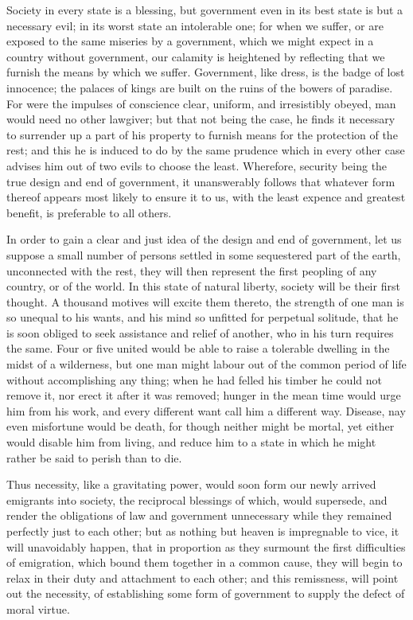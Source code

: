 \documentclass[12pt,oneside]{memoir}
\begin{document}
Society in every state is a blessing, but government even in its
best state is but a necessary evil; in its worst state an
intolerable one; for when we suffer, or are exposed to the same
miseries by a government, which we might expect in a country without
government, our calamity is heightened by reflecting that we furnish
the means by which we suffer. Government, like dress, is the badge
of lost innocence; the palaces of kings are built on the ruins of
the bowers of paradise. For were the impulses of conscience clear,
uniform, and irresistibly obeyed, man would need no other lawgiver;
but that not being the case, he finds it necessary to surrender up a
part of his property to furnish means for the protection of the rest;
and this he is induced to do by the same prudence which in every
other case advises him out of two evils to choose the least.
Wherefore, security being the true design and end of government, it
unanswerably follows that whatever form thereof appears most likely
to ensure it to us, with the least expence and greatest benefit, is
preferable to all others.

In order to gain a clear and just idea of the design and end of
government, let us suppose a small number of persons settled in some
sequestered part of the earth, unconnected with the rest, they will
then represent the first peopling of any country, or of the world.
In this state of natural liberty, society will be their first
thought. A thousand motives will excite them thereto, the strength
of one man is so unequal to his wants, and his mind so unfitted for
perpetual solitude, that he is soon obliged to seek assistance and
relief of another, who in his turn requires the same. Four or five
united would be able to raise a tolerable dwelling in the midst of a
wilderness, but one man might labour out of the common period of
life without accomplishing any thing; when he had felled his timber
he could not remove it, nor erect it after it was removed; hunger in
the mean time would urge him from his work, and every different want
call him a different way. Disease, nay even misfortune would be
death, for though neither might be mortal, yet either would disable
him from living, and reduce him to a state in which he might rather
be said to perish than to die.

Thus necessity, like a gravitating power, would soon form our newly
arrived emigrants into society, the reciprocal blessings of which,
would supersede, and render the obligations of law and government
unnecessary while they remained perfectly just to each other; but as
nothing but heaven is impregnable to vice, it will unavoidably
happen, that in proportion as they surmount the first difficulties
of emigration, which bound them together in a common cause, they
will begin to relax in their duty and attachment to each other; and
this remissness, will point out the necessity, of establishing some
form of government to supply the defect of moral virtue.
\end{document}

